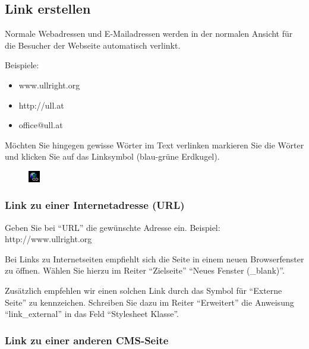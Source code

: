 \documentclass[article, a4paper, oneside, 11pt]{memoir}
\begin{document}
\subsection{Link erstellen}

Normale Webadressen und E-Mailadressen werden in der normalen Ansicht für die Besucher der Webseite automatisch verlinkt.

Beispiele:

\begin{itemize}
\item www.ullright.org
\item http://ull.at
\item office@ull.at
\end{itemize}


Möchten Sie hingegen gewisse Wörter im Text verlinken markieren Sie die Wörter und klicken Sie auf das Linksymbol (blau-grüne Erdkugel).

\begin{figure}
\centering
\includegraphics[width=0.5cm,height=0.5cm]{link_icon}
\end{figure}

\subsubsection{Link zu einer Internetadresse (URL)}
Geben Sie bei "`URL"' die gewünschte Adresse ein. Beispiel: http://www.ullright.org

Bei Links zu Internetseiten empfiehlt sich die Seite in einem neuen Browserfenster zu öffnen. Wählen Sie hierzu im Reiter "`Zielseite"' "`Neues Fenster (\_blank)"'.

Zusätzlich empfehlen wir einen solchen Link durch das Symbol für "`Externe Seite"' zu kennzeichen. Schreiben Sie dazu im Reiter "`Erweitert"' die Anweisung "`link\_external"' in das Feld "`Stylesheet Klasse"'.

\subsubsection{Link zu einer anderen CMS-Seite}
\end{document}
